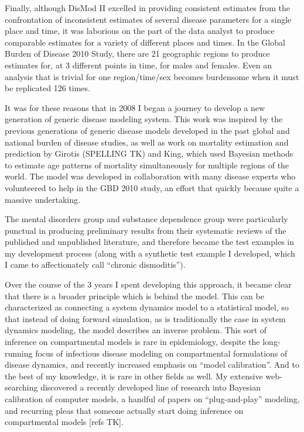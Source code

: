 Finally, although DisMod II excelled in providing consistent estimates
from the confrontation of inconsistent estimates of several disease
parameters for a single place and time, it was laborious on the part
of the data analyst to produce comparable estimates for a variety of
different places and times. In the Global Burden of Disease 2010
Study, there are 21 geographic regions to produce estimates for, at 3
different points in time, for males and females. Even an analysis that
is trivial for one region/time/sex becomes burdensome when it must be
replicated 126 times.

It was for these reasons that in 2008 I began a journey to develop a
new generation of generic disease modeling system. This work was
inspired by the previous generations of generic disease models
developed in the past global and national burden of disease studies,
as well as work on mortality estimation and prediction by Girotis
(SPELLING TK) and King, which used Bayesian methods to estimate age
patterns of mortality simultaneously for multiple regions of the
world. The model was developed in collaboration with many disease
experts who volunteered to help in the GBD 2010 study, an effort that
quickly because quite a massive undertaking.

The mental disorders group and substance dependence group were
particularly punctual in producing preliminary results from their
systematic reviews of the published and unpublished literature, and
therefore became the test examples in my development process (along
with a synthetic test example I developed, which I came to
affectionately call ``chronic dismoditis'').

Over the course of the 3 years I spent developing this approach, it
became clear that there is a broader principle which is behind the
model.  This can be characterized as connecting a system dynamics
model to a statistical model, so that instead of doing forward
simulation, as is traditionally the case in system dynamics modeling,
the model describes an inverse problem. This sort of inference on
compartmental models is rare in epidemiology, despite the long-running
focus of infectious disease modeling on compartmental formulations of
disease dynamics, and recently increased emphasis on ``model
calibration''. And to the best of my knowledge, it is rare in other
fields as well. My extensive web-searching discovered a recently
developed line of research into Bayesian calibration of computer
models, a handful of papers on ``plug-and-play'' modeling, and recurring
pleas that someone actually start doing inference on compartmental
models [refs TK].

